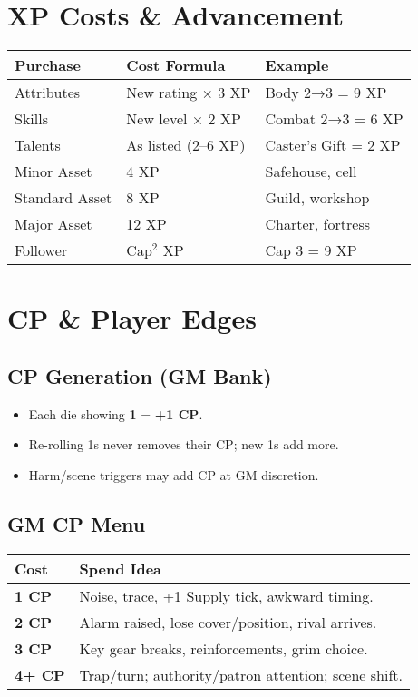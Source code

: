 \begin{multicols}{2}
\section{XP Costs \& Advancement}
\begin{center}
\begin{tabular}{lll}
\toprule
\textbf{Purchase} & \textbf{Cost Formula} & \textbf{Example} \\
\midrule
Attributes & New rating × 3 XP & Body 2→3 = 9 XP \\
Skills & New level × 2 XP & Combat 2→3 = 6 XP \\
Talents & As listed (2–6 XP) & Caster's Gift = 2 XP \\
Minor Asset & 4 XP & Safehouse, cell \\
Standard Asset & 8 XP & Guild, workshop \\
Major Asset & 12 XP & Charter, fortress \\
Follower & Cap$^{2}$ XP & Cap 3 = 9 XP \\
\bottomrule
\end{tabular}
\end{center}

\section{CP \& Player Edges}
\label{qr:edges}

\subsection*{CP Generation (GM Bank)}
\begin{itemize}
  \item Each die showing \textbf{1} = \textbf{+1 CP}.
  \item Re-rolling 1s never removes their CP; new 1s add more.
  \item Harm/scene triggers may add CP at GM discretion.
\end{itemize}

\subsection*{GM CP Menu}
\begin{center}
\begin{tabular}{lp{7.2cm}}
\toprule
\textbf{Cost} & \textbf{Spend Idea} \\
\midrule
\textbf{1 CP} & Noise, trace, +1 Supply tick, awkward timing. \\
\textbf{2 CP} & Alarm raised, lose cover/position, rival arrives. \\
\textbf{3 CP} & Key gear breaks, reinforcements, grim choice. \\
\textbf{4+ CP} & Trap/turn; authority/patron attention; scene shift. \\
\bottomrule
\end{tabular}
\end{center}


\end{multicols}
